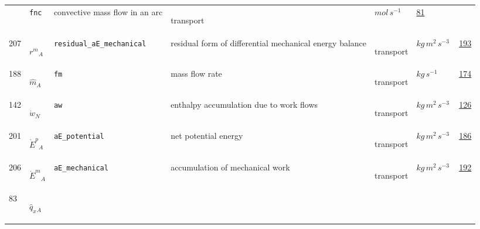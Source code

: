 \begin{longtable}{|p{1cm}|p{2.5cm}|p{4.5cm}|p{8cm}|p{3.0cm}|p{3cm}|p{1cm}|}
             & \verb|fnc|
             & convective mass flow in an arc
             & \begin{lay}transport \end{lay}
             & $ mol \,s^{-1} \, $
             &                 \hyperlink{"e:81"}{ 81 }
                 \\
            207
             & \hypertarget{"v:207"}{ $ {{r^m}}{_{A}} $}
             & \verb|residual_aE_mechanical|
             & residual form of differential mechanical energy balance
             & \begin{lay}transport \end{lay}
             & $ kg \,m^{2} \,s^{-3} \, $
             &                 \hyperlink{"e:193"}{ 193 }
                 \\
            188
             & \hypertarget{"v:188"}{ $ {{\hat{m}}}{_{A}} $}
             & \verb|fm|
             & mass flow rate 
             & \begin{lay}transport \end{lay}
             & $ kg \,s^{-1} \, $
             &                 \hyperlink{"e:174"}{ 174 }
                 \\
            142
             & \hypertarget{"v:142"}{ $ {{\dot{w}}}{_{N}} $}
             & \verb|aw|
             & enthalpy accumulation due to work flows
             & \begin{lay}transport \end{lay}
             & $ kg \,m^{2} \,s^{-3} \, $
             &                 \hyperlink{"e:126"}{ 126 }
                 \\
            201
             & \hypertarget{"v:201"}{ $ {{\dot{E}^p}}{_{A}} $}
             & \verb|aE_potential|
             & net potential energy
             & \begin{lay}transport \end{lay}
             & $ kg \,m^{2} \,s^{-3} \, $
             &                 \hyperlink{"e:186"}{ 186 }
                 \\
            206
             & \hypertarget{"v:206"}{ $ {{\dot{E}^m}}{_{A}} $}
             & \verb|aE_mechanical|
             & accumulation of mechanical work
             & \begin{lay}transport \end{lay}
             & $ kg \,m^{2} \,s^{-3} \, $
             &                 \hyperlink{"e:192"}{ 192 }
                 \\
            83
             & \hypertarget{"v:83"}{ $ {{\hat{q}_x}}{_{A}} $}

\end{longtable}
